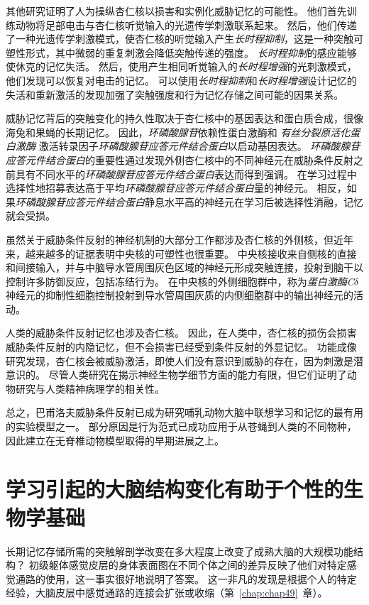 其他研究证明了人为操纵杏仁核以损害和实例化威胁记忆的可能性。
他们首先训练动物将足部电击与杏仁核听觉输入的光遗传学刺激联系起来。
然后，他们传递了一种光遗传学刺激模式，使杏仁核的听觉输入产生\textit{长时程抑制}，这是一种突触可塑性形式，其中微弱的重复刺激会降低突触传递的强度。
\textit{长时程抑制}的感应能够使休克的记忆失活。
然后，使用产生相同听觉输入的\textit{长时程增强}的光刺激模式，他们发现可以恢复对电击的记忆。
可以使用\textit{长时程抑制}和\textit{长时程增强}设计记忆的失活和重新激活的发现加强了突触强度和行为记忆存储之间可能的因果关系。


威胁记忆背后的突触变化的持久性取决于杏仁核中的基因表达和蛋白质合成，很像海兔和果蝇的长期记忆。
因此，\textit{环磷酸腺苷}依赖性蛋白激酶和 \textit{有丝分裂原活化蛋白激酶} 激活转录因子\textit{环磷酸腺苷应答元件结合蛋白}以启动基因表达。
\textit{环磷酸腺苷应答元件结合蛋白}的重要性通过发现外侧杏仁核中的不同神经元在威胁条件反射之前具有不同水平的\textit{环磷酸腺苷应答元件结合蛋白}表达而得到强调。
在学习过程中选择性地招募表达高于平均\textit{环磷酸腺苷应答元件结合蛋白}量的神经元。
相反，如果\textit{环磷酸腺苷应答元件结合蛋白}静息水平高的神经元在学习后被选择性消融，记忆就会受损。


虽然关于威胁条件反射的神经机制的大部分工作都涉及杏仁核的外侧核，但近年来，越来越多的证据表明中央核的可塑性也很重要。
中央核接收来自侧核的直接和间接输入，并与中脑导水管周围灰色区域的神经元形成突触连接，投射到脑干以控制许多防御反应，包括冻结行为。
在中央核的外侧细胞群中，称为\textit{蛋白激酶C}$ \delta $ 神经元的抑制性细胞控制投射到导水管周围灰质的内侧细胞群中的输出神经元的活动。


人类的威胁条件反射记忆也涉及杏仁核。
因此，在人类中，杏仁核的损伤会损害威胁条件反射的内隐记忆，但不会损害已经受到条件反射的外显记忆。
功能成像研究发现，杏仁核会被威胁激活，即使人们没有意识到威胁的存在，因为刺激是潜意识的。
尽管人类研究在揭示神经生物学细节方面的能力有限，但它们证明了动物研究与人类精神病理学的相关性。


总之，巴甫洛夫威胁条件反射已成为研究哺乳动物大脑中联想学习和记忆的最有用的实验模型之一。
部分原因是行为范式已成功应用于从苍蝇到人类的不同物种，因此建立在无脊椎动物模型取得的早期进展之上。



\section{学习引起的大脑结构变化有助于个性的生物学基础}

长期记忆存储所需的突触解剖学改变在多大程度上改变了成熟大脑的大规模功能结构？
初级躯体感觉皮层的身体表面图在不同个体之间的差异反映了他们对特定感觉通路的使用，这一事实很好地说明了答案。
这一非凡的发现是根据个人的特定经验，大脑皮层中感觉通路的连接会扩张或收缩（第~\ref{chap:chap49}~章）。


